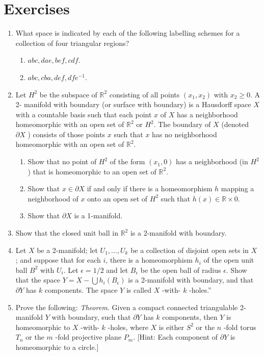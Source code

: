 \section*{Exercises}
\begin{enumerate}[itemsep=0.4em, parsep=0pt, topsep=0pt, partopsep=0pt, leftmargin=*, label=\arabic*., ref=\arabic*]
\item What space is indicated by each of the following labelling schemes for a collection of four triangular regions?
 \begin{enumerate}[itemsep=0.2em, parsep=0pt, topsep=0pt, partopsep=0pt, leftmargin=*, label=(\alph*), align=left]
 \item \({abc},{dae},{bef},{cdf}\).
 \item \({abc},{cba},{def},{df}e^{-1}\).
 \end{enumerate}
\item Let \(H^{2}\) be the subspace of \(\mathbb{R}^{2}\) consisting of all points \(( {x_{1},x_{2}})\) with \(x_{2} \geq 0\). A 2- manifold with boundary (or surface with boundary) is a Hausdorff space \(X\) with a countable basis such that each point \(x\) of \(X\) has a neighborhood homeomorphic with an open set of \(\mathbb{R}^{2}\) or \(H^{2}\). The boundary of \(X\) (denoted \(\partial X\) ) consists of those points \(x\) such that \(x\) has no neighborhood homeomorphic with an open set of \(\mathbb{R}^{2}\).
 \begin{enumerate}[itemsep=0.2em, parsep=0pt, topsep=0pt, partopsep=0pt, leftmargin=*, label=(\alph*), align=left]
 \item Show that no point of \(H^{2}\) of the form \(( {x_{1},0})\) has a neighborhood (in \(H^{2}\) ) that is homeomorphic to an open set of \(\mathbb{R}^{2}\).
 \item Show that \(x \in \partial X\) if and only if there is a homeomorphism \(h\) mapping a neighborhood of \(x\) onto an open set of \(H^{2}\) such that \(h(x) \in \mathbb{R} \times 0\).
 \item Show that \(\partial X\) is a 1-manifold.
 \end{enumerate}
\item Show that the closed unit ball in \(\mathbb{R}^{2}\) is a 2-manifold with boundary.
\item Let \(X\) be a 2-manifold; let \(U_{1},\ldots ,U_{k}\) be a collection of disjoint open sets in \(X\) ; and suppose that for each \(i\), there is a homeomorphism \(h_{i}\) of the open unit ball \(B^{2}\) with \(U_{i}\). Let \(\epsilon = 1/2\) and let \(B_{\epsilon }\) be the open ball of radius \(\epsilon\). Show that the space \(Y = X - \bigcup {h}_{i}( B_{\epsilon })\) is a 2-manifold with boundary, and that \(\partial Y\) has \(k\) components. The space \(Y\) is called \(X\) -with- \(k\) -holes.''
\item Prove the following: \textsl{Theorem.} Given a compact connected triangulable 2-manifold \(Y\) with boundary, such that \(\partial Y\) has \(k\) components, then \(Y\) is homeomorphic to \(X\) -with- \(k\) -holes, where \(X\) is either \(S^{2}\) or the \(n\) -fold torus \(T_{n}\) or the \(m\) -fold projective plane \(P_{m}\). [Hint: Each component of \(\partial Y\) is homeomorphic to a circle.]
\end{enumerate}